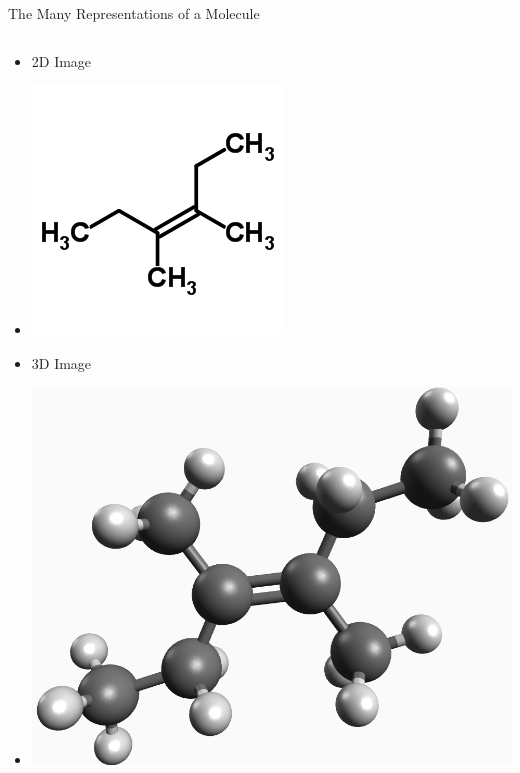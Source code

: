 \documentclass[10pt]{beamer}
\begin{document}
{%
\begin{frame}{The Many Representations of a Molecule}
  \begin{columns}[c] %
    \begin{column}{.33\textwidth}
      \begin{itemize}
        \item[] {\alert{2D Image}}
        \item[] {\includegraphics[width=0.95\linewidth]{images/2dRepr.PNG}}
        \item[] {\alert{3D Image}}
        \item[] {\includegraphics[width=0.95\linewidth]{images/3dRepr.PNG}}
      \end{itemize}
    \end{column}


\end{columns}
\end{frame}}
\end{document}
